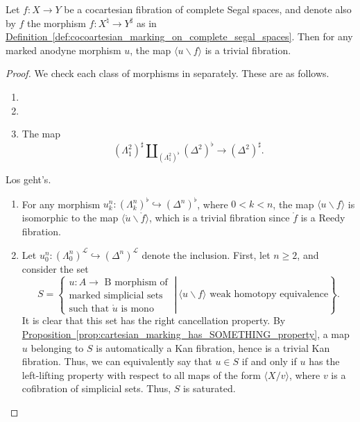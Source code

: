 \documentclass[main.tex]{subfiles}
\begin{document}
\begin{theorem}
  Let $f\colon X \to Y$ be a cocartesian fibration of complete Segal spaces, and denote also by $f$ the morphism $f\colon X^{\natural} \to Y^{\sharp}$ as in \hyperref[def:cocoartesian_marking_on_complete_segal_spaces]{Definition~\ref*{def:cocoartesian_marking_on_complete_segal_spaces}}. Then for any marked anodyne morphism $u$, the map $\langle u \backslash f \rangle$ is a trivial fibration.
\end{theorem}
\begin{proof}
  We check each class of morphisms in \cite{highertopostheory} separately. These are as follows.
  \begin{enumerate}
    \item

    \item

    \item The map
      \begin{equation*}
        (\Lambda^{2}_{1})^{\sharp} \amalg_{(\Lambda^{2}_{1})^{\flat}} (\Delta^{2})^{\flat} \to (\Delta^{2})^{\sharp}.
      \end{equation*}
  \end{enumerate}
  Los geht's.
  \begin{enumerate}
    \item For any morphism $u^{n}_{k}\colon (\Lambda^{n}_{k})^{\flat} \hookrightarrow (\Delta^{n})^{\flat}$, where $0 < k < n$, the map $\langle u \backslash f \rangle$ is isomorphic to the map $\langle \mathring{u} \backslash \mathring{f} \rangle$, which is a trivial fibration since $\mathring{f}$ is a Reedy fibration.

    \item Let $u^{n}_{0}\colon (\Lambda^{n}_{0})^{\mathcal{L}} \hookrightarrow (\Delta^{n})^{\mathcal{L}}$ denote the inclusion. First, let $n \geq 2$, and consider the set
      \begin{equation*}
        S = \left\{\left.\substack{
          u\colon A \to \text{ B morphism of} \\
          \text{marked simplicial sets} \\
          \text{such that $\mathring{u}$ is mono}
        }
        \ \right| \
        \langle u \backslash f \rangle \text{ weak homotopy equivalence}
      \right\}.
    \end{equation*}
    It is clear that this set has the right cancellation property. By \hyperref[prop:cartesian_marking_has_SOMETHING_property]{Proposition~\ref*{prop:cartesian_marking_has_SOMETHING_property}}, a map $u$ belonging to $S$ is automatically a Kan fibration, hence is a trivial Kan fibration. Thus, we can equivalently say that $u \in S$ if and only if $u$ has the left-lifting property with respect to all maps of the form $\langle X / v \rangle$, where $v$ is a cofibration of simplicial sets. Thus, $S$ is saturated.


\end{enumerate}
\end{proof}
\end{document}
